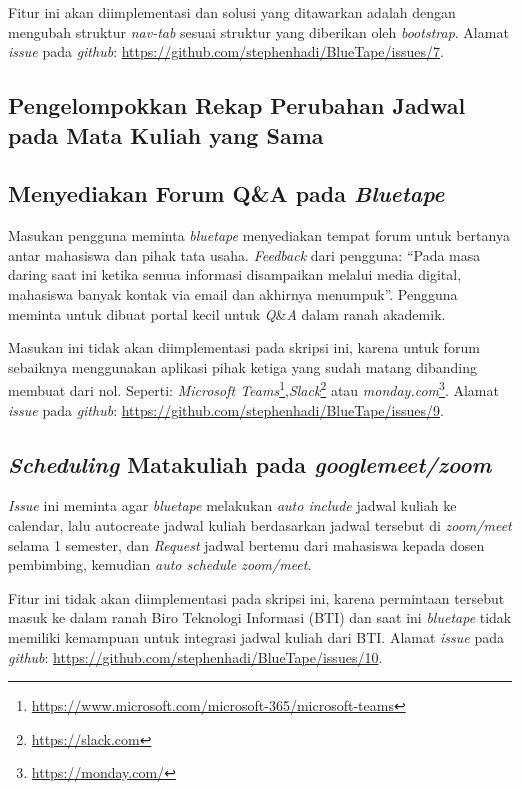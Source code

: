 Fitur ini akan diimplementasi dan solusi yang ditawarkan adalah dengan mengubah struktur \textit{nav-tab} sesuai struktur yang diberikan oleh \textit{bootstrap}. Alamat \textit{issue} pada \textit{github}: \url{https://github.com/stephenhadi/BlueTape/issues/7}.

\subsection{Pengelompokkan Rekap Perubahan Jadwal pada Mata Kuliah yang Sama}
\label{issue:8}
\subsection{Menyediakan Forum Q\&A pada \textit{Bluetape}}
\label{issue:9}
Masukan pengguna meminta \textit{bluetape} menyediakan tempat forum untuk bertanya antar mahasiswa dan pihak tata usaha. \textit{Feedback} dari pengguna: ``Pada masa daring saat ini ketika semua informasi disampaikan melalui media digital, mahasiswa banyak kontak via email dan akhirnya menumpuk''.  Pengguna meminta untuk dibuat portal kecil untuk \textit{Q}\&\textit{A} dalam ranah akademik.

Masukan ini tidak akan diimplementasi pada skripsi ini, karena untuk forum sebaiknya menggunakan aplikasi pihak ketiga yang sudah matang dibanding membuat dari nol. Seperti: \textit{Microsoft Teams}\footnote{\url{https://www.microsoft.com/microsoft-365/microsoft-teams}},\textit{Slack}\footnote{\url{https://slack.com}} atau \textit{monday.com}\footnote{\url{https://monday.com/}}. Alamat \textit{issue} pada \textit{github}: \url{https://github.com/stephenhadi/BlueTape/issues/9}. 

\subsection{\textit{Scheduling} Matakuliah pada \textit{googlemeet/zoom}}
\label{issue:10}
\textit{Issue} ini meminta agar \textit{bluetape} melakukan \textit{auto include} jadwal kuliah ke calendar, lalu {autocreate} jadwal kuliah berdasarkan jadwal tersebut di \textit{zoom/meet} selama 1 semester, dan \textit{Request} jadwal bertemu dari mahasiswa kepada dosen pembimbing, kemudian \textit{auto schedule zoom/meet}.

Fitur ini tidak akan diimplementasi pada skripsi ini, karena permintaan tersebut masuk ke dalam ranah Biro Teknologi Informasi (BTI) dan saat ini \textit{bluetape} tidak memiliki kemampuan untuk integrasi jadwal kuliah dari BTI. Alamat \textit{issue} pada \textit{github}: \url{https://github.com/stephenhadi/BlueTape/issues/10}. 

